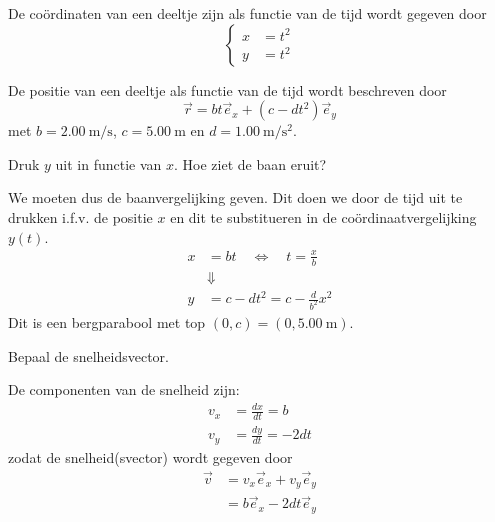 \documentclass{ximera}
\begin{document}
\begin{exercise}
De coördinaten van een deeltje zijn als functie van de tijd wordt gegeven door
\[
\left\{
\begin{aligned}
	x&=t^2 \\
	y&=t^2
\end{aligned}
\right.
\]

\begin{multipleChoice}
\end{multipleChoice}
\end{exercise}

\begin{exercise}
	De positie van een deeltje als functie van de tijd wordt beschreven door
	\[
	\vec{r}=bt\vec{e}_x+(c-dt^2)\vec{e}_y
	\]
	met $b=\SI{2,00}{\meter\per\second}$, $c=\SI{5,00}{\meter}$ en $d=\SI{1,00}{\meter\per\second\squared}$.
	
	\begin{question}
	Druk $y$ uit in functie van $x$. Hoe ziet de baan eruit?
	
	\begin{oplossing}
	We moeten dus de baanvergelijking geven. 
	Dit doen we door de tijd uit te drukken i.f.v. de positie $x$ en dit te substitueren in de coördinaatvergelijking $y(t)$.
	\begin{align*}
	x&=bt \quad \Leftrightarrow \quad t=\frac{x}{b}\\
	&\Downarrow\\
	y&=c-dt^2=c-\frac{d}{b^2}x^2
	\end{align*}
	Dit is een bergparabool met top $(0,c)=(0,\SI{5,00}{\meter})$.
	\end{oplossing}
	\end{question}
	
	\begin{question}
	Bepaal de snelheidsvector.
	
	\begin{oplossing}
	De componenten van de snelheid zijn:
	\begin{align*}
	v_x&=\frac{dx}{dt}=b\\
	v_y&=\frac{dy}{dt}=-2dt
	\end{align*}
	zodat de snelheid(svector) wordt gegeven door
	\begin{align*}
	\vec{v}&=v_x\vec{e}_x+v_y\vec{e}_y\\
	&=b\vec{e}_x-2dt\vec{e}_y
	\end{align*}
	\end{oplossing}
	\end{question}
	

\end{exercise}
\end{document}
